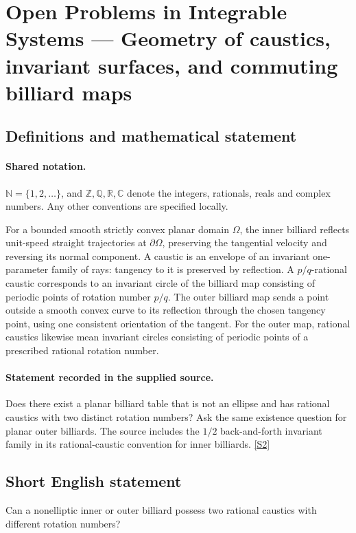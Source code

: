 \documentclass[11pt]{article}
\newcommand{\sref}[2]{\hyperlink{source:#1:#2}{[S#2]}}
\begin{document}
\section{Open Problems in Integrable Systems — Geometry of caustics, invariant surfaces, and commuting billiard maps}\label{statement}

\subsection{Definitions and mathematical statement}

\paragraph{Shared notation.}$\mathbb N=\{1,2,\ldots\}$, and $\mathbb Z,\mathbb Q,\mathbb R,\mathbb C$ denote the integers, rationals, reals and complex numbers. Any other conventions are specified locally.


For a bounded smooth strictly convex planar domain $\Omega$, the inner billiard reflects unit-speed straight trajectories at $\partial\Omega$, preserving the tangential velocity and reversing its normal component. A caustic is an envelope of an invariant one-parameter family of rays: tangency to it is preserved by reflection. A $p/q$-rational caustic corresponds to an invariant circle of the billiard map consisting of periodic points of rotation number $p/q$. The outer billiard map sends a point outside a smooth convex curve to its reflection through the chosen tangency point, using one consistent orientation of the tangent. For the outer map, rational caustics likewise mean invariant circles consisting of periodic points of a prescribed rational rotation number.
\paragraph{Statement recorded in the supplied source.}
Does there exist a planar billiard table that is not an ellipse and has rational caustics with two distinct rotation numbers? Ask the same existence question for planar outer billiards. The source includes the $1/2$ back-and-forth invariant family in its rational-caustic convention for inner billiards. \sref{statement}{2}
\subsection{Short English statement}
Can a nonelliptic inner or outer billiard possess two rational caustics with different rotation numbers?
\end{document}
